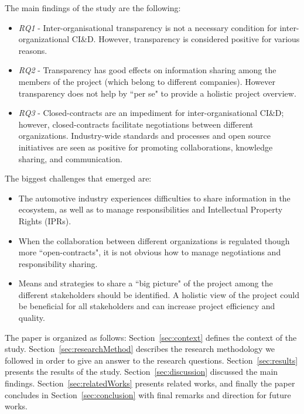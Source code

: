 The main findings of the study are the following:
\begin{itemize}
\item {\em RQ1} - Inter-organisational transparency is not a necessary condition for inter-organizational CI\&D. However, transparency is considered positive for various reasons. %
\item {\em RQ2} - Transparency has good effects on information sharing among the members of the project (which belong to different companies). However transparency does not help by ``per se" to provide a holistic project overview.
\item {\em RQ3} - Closed-contracts are an impediment for inter-organisational CI\&D; however, closed-contracts facilitate negotiations between different organizations. Industry-wide standards and processes and open source initiatives are seen as positive for promoting collaborations, knowledge sharing, and communication.
\end{itemize}

The biggest challenges that emerged are: 

\begin{itemize}
\item  The automotive industry experiences difficulties to share information in the ecosystem, as well as to manage responsibilities and Intellectual Property Rights (IPRs). 
\item When the collaboration between different organizations is regulated though more ``open-contracts", it is not obvious  how to manage negotiations and responsibility sharing.
\item Means and strategies to share a ``big picture" of the project among the different stakeholders should be identified. A holistic view of the project could be beneficial for all stakeholders and can increase project efficiency and quality. 
\end{itemize}



The paper is organized as follows: Section~\ref{sec:context} defines the context of the study. Section~\ref{sec:researchMethod} describes the research methodology we followed in order to give an answer to the research questions. Section~\ref{sec:results} presents the results of the study. Section~\ref{sec:discussion} discussed the main findings. Section~\ref{sec:relatedWorks} presents related works, and finally the paper concludes in Section~\ref{sec:conclusion} with final remarks and direction for future works.
